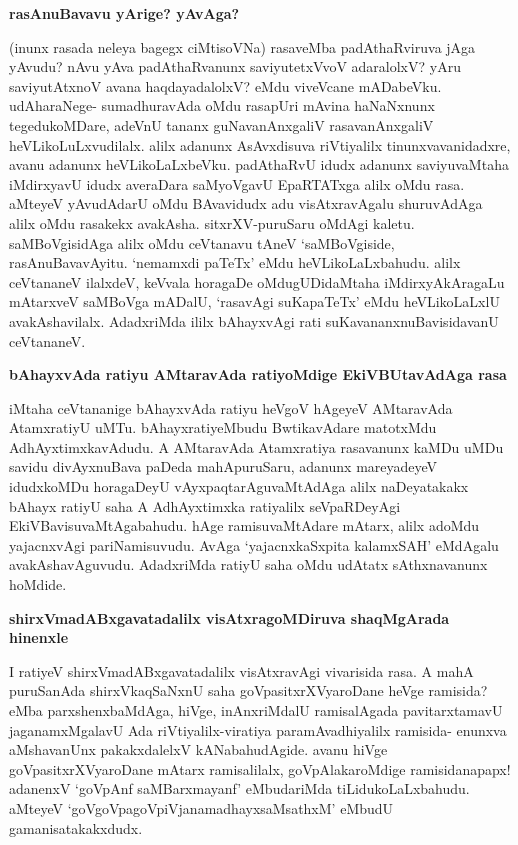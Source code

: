 {\bigskip
\noindent
{\large\bf rasAnuBavavu yArige? yAvAga?}}\label{page227}
\medskip

\noindent
(inunx rasada neleya bagegx ciMtisoVNa) rasaveMba padAthaRviruva jAga yAvudu? nAvu yAva padAthaRvanunx saviyutetxVvoV adaralolxV? yAru saviyutAtxnoV avana haqdayadalolxV? eMdu viveVcane mADabeVku. udAharaNege- sumadhuravAda oMdu rasapUri mAvina haNaNxnunx tegedu\-koMDare, adeVnU tananx guNavanAnxgaliV rasavanAnxgaliV heVLikoLuLxvudilalx. alilx adanunx AsAvxdisuva riVti\-yalilx tinunx\-vavanidadxre, avanu adanunx heVLikoLaLxbeVku. padAthaRvU idudx adanunx saviyuvaMtaha iMdirxyavU idudx averaDara saMyoVgavU EpaRTATxga alilx oMdu rasa. aMteyeV yAvudAdarU oMdu BAvavidudx adu visAtxravAgalu shuruvAdAga alilx oMdu rasakekx avakAsha. sitxrXV-puruSaru oMdAgi kaletu. saMBoVgisidAga alilx oMdu ceVtanavu tAneV `saMBoVgiside, rasAnuBava\-vAyitu. `nemamxdi paTeTx' eMdu heVLikoLaLxbahudu. alilx ceVtananeV ilalxdeV, keVvala horagaDe oMdugUDi\-daMtaha iMdirxyAkAragaLu mAtarxveV saMBoVga mADalU, `rasavAgi suKapaTeTx' eMdu heVLikoLaLxlU avakAsha\-vilalx. AdadxriMda ililx bAhayxvAgi rati suKavananxnuBavisidavanU ceVtananeV.

{\bigskip
\noindent
{\large\bf bAhayxvAda ratiyu AMtaravAda ratiyoMdige EkiVBUtavAdAga rasa}}\label{page228}
\medskip

\noindent
iMtaha ceVtananige bAhayxvAda ratiyu heVgoV hAgeyeV AMtaravAda Atamx\break\-ratiyU uMTu. bAhayxratiyeMbudu BwtikavAdare matotxMdu AdhAyxtimxka\-vAdudu. A AMtaravAda Atamxratiya rasa\-vanunx kaMDu uMDu savidu divAyxnuBava paDeda mahApuruSaru, adanunx mareyadeyeV idudxkoMDu horagaDeyU vAyxpaqtarAguvaMtAdAga alilx naDeyatakakx bAhayx ratiyU saha A AdhAyxtimxka ratiyalilx seVpaRDeyAgi EkiVBavisuvaMtAgabahudu. hAge ramisuvaMtAdare mAtarx, alilx adoMdu yajacnxvAgi pariNamisuvudu. AvAga `yajacnxkaSxpita kalamxSAH'\label{228} eMdAgalu avakAshavAguvudu. AdadxriMda ratiyU saha oMdu udAtatx sAthxnavanunx hoMdide.

{\bigskip
\noindent
{\large\bf shirxVmadABxgavatadalilx visAtxragoMDiruva shaqMgArada hinenxle}}
\medskip

\noindent
I ratiyeV shirxVmadABxgavatadalilx visAtxravAgi vivarisida rasa. A mahA puruSanAda shirxVkaqSaNxnU saha\- goVpasitxrXVyaroDane heVge ramisida? eMba parxshenxbaMdAga, hiVge, inAnxriMdalU ramisa\-lAgada pavitarx\-tamavU jaganamxMgalavU Ada riVtiyalilx-\break viratiya paramAvadhiyalilx ramisida- enunxva aMshavanUnx pakakxdalelxV kANabahu\-dAgide. avanu hiVge goVpasitxrXVyaroDane mAtarx ramisalilalx, goVpAlakaroMdige ramisidanapapx! adanenxV `goVpAnf saMBarxmayanf'\label{229} eMbudariMda tiLidukoLaLx\break\-bahudu. aMteyeV `goV\-goVpagoVpiVjanamadhayxsaMsathxM'\label{229} eMbudU gamanisa\-takakxdudx.

